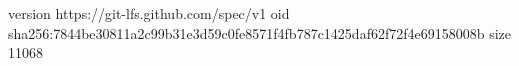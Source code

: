 version https://git-lfs.github.com/spec/v1
oid sha256:7844be30811a2c99b31e3d59c0fe8571f4fb787c1425daf62f72f4e69158008b
size 11068
